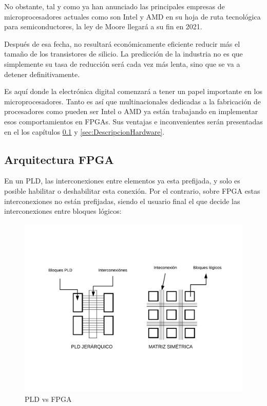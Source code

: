 No obstante, tal y como ya han anunciado las principales empresas de microprocesadores actuales como son Intel y AMD en su hoja de ruta tecnológica para semiconductores, la ley de Moore llegará a su fin en 2021. \newline

Después de esa fecha, no resultará económicamente eficiente reducir más el tamaño de los transistores de silicio. La predicción de la industria no es que simplemente su tasa de reducción será cada vez más lenta, sino que se va a detener definitivamente. \newline

Es aquí donde la electrónica digital comenzará a tener un papel importante en los microprocesadores. Tanto es así que multinacionales dedicadas a la fabricación de procesadores como pueden ser Intel o AMD ya están trabajando en implementar esos comportamientos en FPGAs. Sus ventajas e inconvenientes serán presentadas en el los capítulos \ref{sec:ArquitecturaFPGA} y \ref{sec:DescripcionHardware}.

\subsection{Arquitectura FPGA}\label{sec:ArquitecturaFPGA}

En un PLD, las interconexiones entre elementos ya esta prefijada, y solo es posible habilitar o deshabilitar esta conexión. \newline
Por el contrario, sobre FPGA estas interconexiones no están prefijadas, siendo el usuario final el que decide las interconexiones entre bloques lógicos:
\newline
\begin{center}
\begin{figure}[H]
	\center
	\includegraphics[trim = 10mm 35mm 10mm 35mm, clip,scale=0.6]{imagenes/EstadoArte/pld_fpga.pdf}
	\caption{PLD vs FPGA}
	\label{fig:pld_fpga}
\end{figure}

\end{center}


